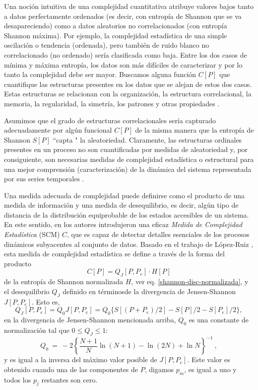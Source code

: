 Una noción intuitiva de una complejidad cuantitativa atribuye valores bajos tanto a datos perfectamente ordenados (es decir, con entropía de Shannon que se va desapareciendo) como a datos aleatorios no correlacionados (con entropía Shannon máxima).
Por ejemplo, la complejidad estadística de una simple oscilación o tendencia (ordenada), pero también de ruido blanco no correlacionado (no ordenado) sería clasificada como baja.
Entre los dos casos de mínima y máxima entropía, los datos son más difíciles de caracterizar y por lo tanto la complejidad debe ser mayor.
Buscamos alguna función $C[P]$ que cuantifique las estructuras presentes en los datos que se alejan de estos dos casos.
Estas estructuras se relacionan con la organización, la estructura correlacional, la memoria, la regularidad, la simetría, los patrones y otras propiedades \cite{Feldman2008}.

Asumimos que el grado de estructuras correlacionales sería capturado adecuadamente por algún funcional $C[P]$ de la misma manera que la entropía de Shannon $S[P]$ \cite{Shannon1948} ``capta " la aleatoriedad.
Claramente, las estructuras ordinales presentes en un proceso no son cuantificadas por medidas de aleatoriedad y, por consiguiente, son necesarias medidas de complejidad estadística o estructural para una mejor comprensión (caracterización) de la dinámica del sistema representada por sus series temporales \cite{Feldman1998}.

Una medida adecuada de complejidad puede definirse como el producto de una medida de información y una medida de desequilibrio, es decir, algún tipo de distancia de la distribución equiprobable de los estados accesibles de un sistema.
En este sentido, en \cite{Lamberti2004} los autores introdujeron una eficaz {\it Medida de Complejidad Estadística \/} (SCM) $C$, que es capaz de detectar detalles esenciales de los procesos dinámicos subyacentes al conjunto de datos.
Basado en el trabajo de López-Ruiz \cite{Lopez1995}, esta medida de complejidad estadística \cite{Martin2003,Lamberti2004} se define a través de la forma del producto
\begin{equation}
C[P] = Q_{J}[P,P_e] \cdot H[P]
\label{complexity}
\end{equation}
de la entropía de Shannon normalizada $H$, ver eq. \eqref{shannon-disc-normalizada}, y el desequilibrio $Q_{J}$ definido en términosde la divergencia de Jensen-Shannon $J[P, P_e]$.
Esto es,
\begin{equation}
\label{disequilibrium}	
Q_{J} [ P, P_e] = Q_{0} J[ P, P_e] = Q_{0} \{ S[(P + P_e)/2 ] - S[ P ]/2 - S[P_e]/2\},
\end{equation}
en la divergencia de Jensen-Shannon mencionada arriba, $Q_0$ es una constante de normalización tal que $0 \leq Q_{J} \leq 1$:
\begin{equation}
Q_0 ~=~ -2 \left\{ {\frac{N+1}{N}} \ln (N+1) - \ln (2N) + \ln N \right\}^{-1} \ ,
\label{q0-jensen-1}
\end{equation}
y es igual a la inversa del máximo valor posible de $J [P,P_e]$.
Este valor es obtenido cuando una de las componentes de $P$, digamos $p_m$, es igual a uno y todos los $p_j$ restantes son cero.

